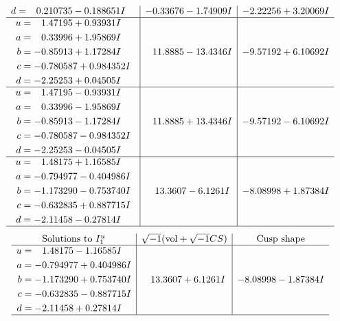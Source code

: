 \documentclass[1p]{elsarticle_modified}
\theoremstyle{definition}
\newcommand{\I}{\sqrt{-1}}
\begin{document}
$$\begin{array}{c|c|c}
\begin{aligned}
d &= \phantom{-}0.210735 - 0.188651 I\end{aligned}
 & -0.33676 - 1.74909 I & -2.22256 + 3.20069 I \\ \hline\begin{aligned}
u &= \phantom{-}1.47195 + 0.93931 I \\
a &= \phantom{-}0.33996 + 1.95869 I \\
b &= -0.85913 + 1.17284 I \\
c &= -0.780587 + 0.984352 I \\
d &= -2.25253 + 0.04505 I\end{aligned}
 & \phantom{-}11.8885 - 13.4346 I & -9.57192 + 6.10692 I \\ \hline\begin{aligned}
u &= \phantom{-}1.47195 - 0.93931 I \\
a &= \phantom{-}0.33996 - 1.95869 I \\
b &= -0.85913 - 1.17284 I \\
c &= -0.780587 - 0.984352 I \\
d &= -2.25253 - 0.04505 I\end{aligned}
 & \phantom{-}11.8885 + 13.4346 I & -9.57192 - 6.10692 I \\ \hline\begin{aligned}
u &= \phantom{-}1.48175 + 1.16585 I \\
a &= -0.794977 - 0.404986 I \\
b &= -1.173290 - 0.753740 I \\
c &= -0.632835 + 0.887715 I \\
d &= -2.11458 - 0.27814 I\end{aligned}
 & \phantom{-}13.3607 - 6.1261 I & -8.08998 + 1.87384 I\\
 \hline 
 \end{array}$$\newpage$$\begin{array}{c|c|c}  
\text{Solutions to }I^u_{1}& \I (\text{vol} + \sqrt{-1}CS) & \text{Cusp shape}\\
 \hline 
\begin{aligned}
u &= \phantom{-}1.48175 - 1.16585 I \\
a &= -0.794977 + 0.404986 I \\
b &= -1.173290 + 0.753740 I \\
c &= -0.632835 - 0.887715 I \\
d &= -2.11458 + 0.27814 I\end{aligned}
 & \phantom{-}13.3607 + 6.1261 I & -8.08998 - 1.87384 I\\
 \hline 
 \end{array}$$\newpage\newpage\renewcommand{\arraystretch}{1}
\end{document}
